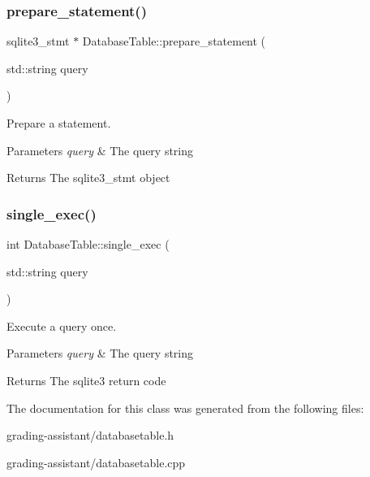 \subsubsection{\texorpdfstring{prepare\+\_\+statement()}{prepare\_statement()}}
{\footnotesize\ttfamily sqlite3\+\_\+stmt $\ast$ Database\+Table\+::prepare\+\_\+statement (\begin{DoxyParamCaption}\item[{std\+::string}]{query }\end{DoxyParamCaption})}



Prepare a statement. 


\begin{DoxyParams}{Parameters}
{\em query} & The query string \\
\hline
\end{DoxyParams}
\begin{DoxyReturn}{Returns}
The sqlite3\+\_\+stmt object 
\end{DoxyReturn}
\mbox{\label{class_database_table_aa6a3790e2f842bcf9b05a762b39f0645}} 
\subsubsection{\texorpdfstring{single\+\_\+exec()}{single\_exec()}}
{\footnotesize\ttfamily int Database\+Table\+::single\+\_\+exec (\begin{DoxyParamCaption}\item[{std\+::string}]{query }\end{DoxyParamCaption})}



Execute a query once. 


\begin{DoxyParams}{Parameters}
{\em query} & The query string \\
\hline
\end{DoxyParams}
\begin{DoxyReturn}{Returns}
The sqlite3 return code 
\end{DoxyReturn}


The documentation for this class was generated from the following files\+:\begin{DoxyCompactItemize}
\item 
grading-\/assistant/databasetable.\+h\item 
grading-\/assistant/databasetable.\+cpp\end{DoxyCompactItemize}
